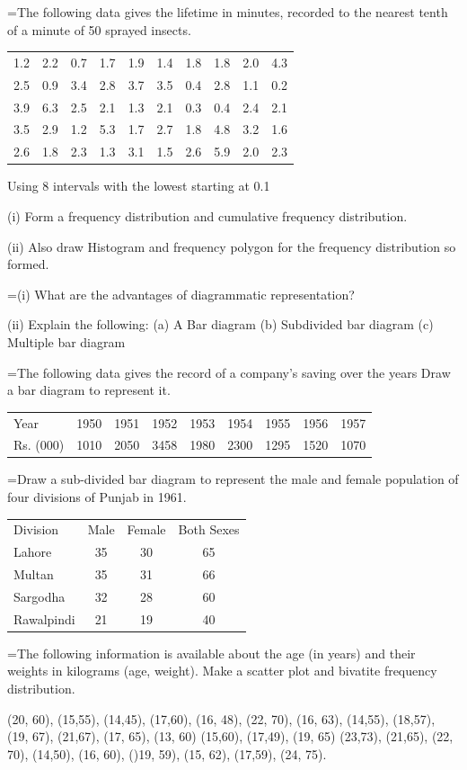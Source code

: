 \documentclass[11pt,a4paper]{article}
\newlength{\qw}
\newcommand{\q}[2]{%
  \Needspace{3\baselineskip}%
  \par\medskip\noindent\hangindent=\qw\hangafter=1\makebox[\qw][l]{\textbf{#1.}}#2\par}
\begin{document}
\q{14}{The following data gives the lifetime in minutes, recorded to the nearest tenth of a minute of 50 sprayed insects.\par\smallskip
\begin{tabular}{|cccccccccc|}\hline
1.2 & 2.2 & 0.7 & 1.7 & 1.9 & 1.4 & 1.8 & 1.8 & 2.0 & 4.3\\
2.5 & 0.9 & 3.4 & 2.8 & 3.7 & 3.5 & 0.4 & 2.8 & 1.1 & 0.2\\
3.9 & 6.3 & 2.5 & 2.1 & 1.3 & 2.1 & 0.3 & 0.4 & 2.4 & 2.1\\
3.5 & 2.9 & 1.2 & 5.3 & 1.7 & 2.7 & 1.8 & 4.8 & 3.2 & 1.6\\
2.6 & 1.8 & 2.3 & 1.3 & 3.1 & 1.5 & 2.6 & 5.9 & 2.0 & 2.3\\\hline
\end{tabular}\par\smallskip
Using 8 intervals with the lowest starting at 0.1\par\smallskip (i) Form a frequency distribution and cumulative frequency distribution.\par (ii) Also draw Histogram and frequency polygon for the frequency distribution so formed.}
\q{15}{(i) What are the advantages of diagrammatic representation?\par (ii) Explain the following: (a) A Bar diagram (b) Subdivided bar diagram (c) Multiple bar diagram}
\q{16}{The following data gives the record of a company's saving over the years Draw a bar diagram to represent it.\par\smallskip
\begin{tabular}{|l|cccccccc|}\hline
Year & 1950 & 1951 & 1952 & 1953 & 1954 & 1955 & 1956 & 1957\\
Rs. (000) & 1010 & 2050 & 3458 & 1980 & 2300 & 1295 & 1520 & 1070\\\hline
\end{tabular}}
\q{17}{Draw a sub-divided bar diagram to represent the male and female population of four divisions of Punjab in 1961.\par\smallskip
\begin{tabular}{|l|c|c|c|}\hline
Division & Male & Female & Both Sexes\\
Lahore & 35 & 30 & 65\\
Multan & 35 & 31 & 66\\
Sargodha & 32 & 28 & 60\\
Rawalpindi & 21 & 19 & 40\\\hline
\end{tabular}}
\q{18}{The following information is available about the age (in years) and their weights in kilograms (age, weight). Make a scatter plot and bivatite frequency distribution.\par (20, 60), (15,55), (14,45), (17,60), (16, 48), (22, 70), (16, 63), (14,55), (18,57), (19, 67), (21,67), (17, 65), (13, 60) (15,60), (17,49), (19, 65) (23,73), (21,65), (22, 70), (14,50), (16, 60), ()19, 59), (15, 62), (17,59), (24, 75).}
\end{document}
